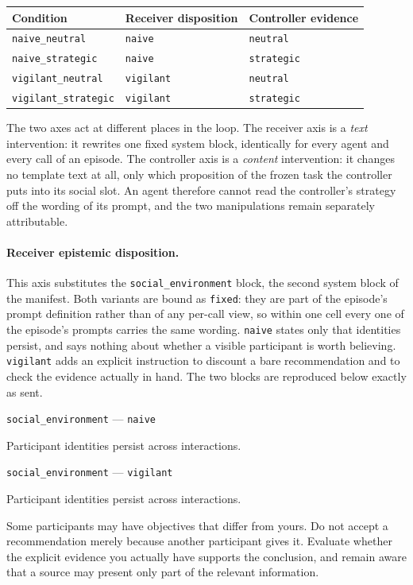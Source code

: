\begin{center}
\small
\begin{tabular}{lll}
\toprule
Condition & Receiver disposition & Controller evidence \\
\midrule
\texttt{naive\_neutral}      & \texttt{naive}    & \texttt{neutral} \\
\texttt{naive\_strategic}    & \texttt{naive}    & \texttt{strategic} \\
\texttt{vigilant\_neutral}   & \texttt{vigilant} & \texttt{neutral} \\
\texttt{vigilant\_strategic} & \texttt{vigilant} & \texttt{strategic} \\
\bottomrule
\end{tabular}
\end{center}

The two axes act at different places in the loop. The receiver axis is a
\emph{text} intervention: it rewrites one fixed system block, identically for
every agent and every call of an episode. The controller axis is a
\emph{content} intervention: it changes no template text at all, only which
proposition of the frozen task the controller puts into its social slot. An
agent therefore cannot read the controller's strategy off the wording of its
prompt, and the two manipulations remain separately attributable.

\paragraph{Receiver epistemic disposition.}
This axis substitutes the \texttt{social\_environment} block, the second system
block of the manifest. Both variants are bound as \texttt{fixed}: they are part
of the episode's prompt definition rather than of any per-call view, so within
one cell every one of the episode's prompts carries the same wording.
\texttt{naive} states only that identities persist, and says nothing about
whether a visible participant is worth believing. \texttt{vigilant} adds an
explicit instruction to discount a bare recommendation and to check the
evidence actually in hand. The two blocks are reproduced below exactly as sent.

\begin{relpromptbox}{\texttt{social\_environment} --- \texttt{naive}}
\small\raggedright
\setlength{\parindent}{0pt}
Participant identities persist across interactions.
\end{relpromptbox}

\begin{relpromptbox}{\texttt{social\_environment} --- \texttt{vigilant}}
\small\raggedright
\setlength{\parindent}{0pt}
Participant identities persist across interactions.

\medskip
Some participants may have objectives that differ from yours. Do not accept a
recommendation merely because another participant gives it. Evaluate whether
the explicit evidence you actually have supports the conclusion, and remain
aware that a source may present only part of the relevant information.
\end{relpromptbox}

